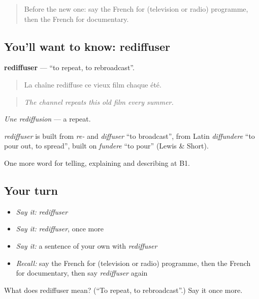 \begin{quote}
Before the new one: say the French for (television or radio) programme, then the French for documentary.
\end{quote}

\subsection*{You'll want to know: rediffuser}
\textbf{rediffuser} — \textquotedblleft{}to repeat, to rebroadcast\textquotedblright{}.

\begin{quote}
La chaîne rediffuse ce vieux film chaque été.
\end{quote}

\begin{quote}
\emph{The channel repeats this old film every summer.}
\end{quote}

\emph{Une rediffusion} — a repeat.

\begin{cousinweb}
\emph{rediffuser} is built from \emph{re-} and \emph{diffuser} \textquotedblleft{}to broadcast\textquotedblright{}, from Latin \emph{diffundere} \textquotedblleft{}to pour out, to spread\textquotedblright{}, built on \emph{fundere} \textquotedblleft{}to pour\textquotedblright{} (Lewis \& Short).
\end{cousinweb}

\begin{grammarlens}[title={What you've built}]
One more word for telling, explaining and describing at B1.
\end{grammarlens}

\subsection*{Your turn}
\begin{itemize}
\raggedright
  \item \emph{Say it:} \emph{rediffuser}
  \item \emph{Say it:} \emph{rediffuser}, once more
  \item \emph{Say it:} a sentence of your own with \emph{rediffuser}
  \item \emph{Recall:} say the French for (television or radio) programme, then the French for documentary, then say \emph{rediffuser} again
\end{itemize}

\begin{tcolorbox}[breakable,colback=teal!4,colframe=teal!35!black,title={Before you move on}]
What does rediffuser mean? (\textquotedblleft{}To repeat, to rebroadcast\textquotedblright{}.) Say it once more.
\end{tcolorbox}
